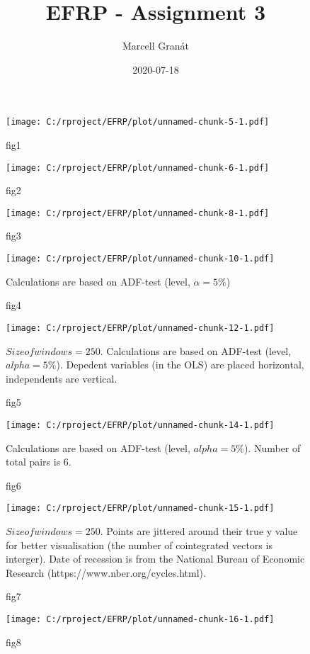\documentclass{article}
\title{EFRP -  Assignment 3}
\date{2020-07-18}
\author{Marcell Granát}
\begin{document}
  \maketitle
  \newpage
  
\begin{figure}[h]
  \centering
  \texttt{[image: C:/rproject/EFRP/plot/unnamed-chunk-5-1.pdf]}
  \caption{fig1}
  \label{Time-series used in this study}
\end{figure}

\begin{figure}[h]
  \centering
  \texttt{[image: C:/rproject/EFRP/plot/unnamed-chunk-6-1.pdf]}
  \caption{fig2}
  \label{Correlation-matrix}
\end{figure}

\begin{figure}[h]
  \centering
  \texttt{[image: C:/rproject/EFRP/plot/unnamed-chunk-8-1.pdf]}
  \caption{fig3}
  \label{First difference of the time-series}
\end{figure}

\begin{figure}[h]
  \centering
  \texttt{[image: C:/rproject/EFRP/plot/unnamed-chunk-10-1.pdf]}
  \caption{fig4}
  \label{Results of Engle-Granger method}
  Calculations are based on ADF-test (level, $\alpha = 5\%$)
\end{figure}

\begin{figure}[h]
  \centering
  \texttt{[image: C:/rproject/EFRP/plot/unnamed-chunk-12-1.pdf]}
  \caption{fig5}
  \label{Results of Engle-Granger method with rolling window}
  $Size of windows = 250$. Calculations are based on ADF-test (level, $alpha = 5\%$). Depedent variables (in the OLS) are placed horizontal, independents are vertical.
\end{figure}

\begin{figure}[h]
  \centering
  \texttt{[image: C:/rproject/EFRP/plot/unnamed-chunk-14-1.pdf]}
  \caption{fig6}
  \label{Summary results of Engle-Granger method with rolling window}
  Calculations are based on ADF-test (level, $alpha = 5\%$). Number of total pairs is 6.
\end{figure}

\begin{figure}[h]
  \centering
  \texttt{[image: C:/rproject/EFRP/plot/unnamed-chunk-15-1.pdf]}
  \caption{fig7}
  \label{Results of Johansen-test with rolling window across time}
  $Size of windows = 250$. Points are jittered around their true y value for better visualisation (the number of cointegrated vectors is interger). Date of recession is from the National Bureau of Economic Research (https://www.nber.org/cycles.html).
\end{figure}

\begin{figure}[h]
  \centering
  \texttt{[image: C:/rproject/EFRP/plot/unnamed-chunk-16-1.pdf]}
  \caption{fig8}
  \label{Distribuiton of the Johansen-test results with rolling window}
\end{figure}
\end{document}
